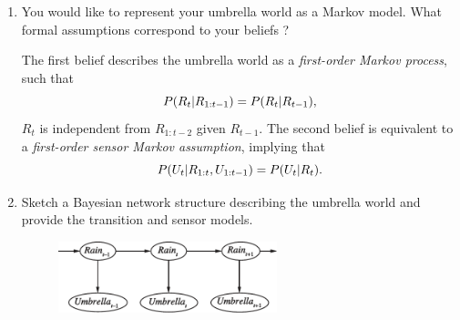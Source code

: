 \documentclass[11pt, a4paper]{article}
\begin{document}
\begin{enumerate}
    \item You would like to represent your umbrella world as a Markov model. What formal assumptions correspond to your beliefs ?

    \begin{solution}
        The first belief describes the umbrella world as a \emph{first-order Markov process}, such that
        \begin{equation*}
            P(R_t \vert R_{1:t-1}) = P(R_t \vert R_{t-1}),
        \end{equation*}
        \ie{} $R_t$ is independent from $R_{1:t - 2}$ given $R_{t-1}$. The second belief is equivalent to a \emph{first-order sensor Markov assumption}, implying that
        \begin{equation*}
            P(U_t \vert R_{1:t}, U_{1:t-1}) = P(U_t \vert R_{t}).
        \end{equation*}
    \end{solution}

    \item Sketch a Bayesian network structure describing the umbrella world and provide the transition and sensor models.

    \begin{solution}
        \begin{figure}[H]
            \centering
            \includegraphics[width=0.6\textwidth]{figures/e4_umbrella.pdf}
        \end{figure}


\end{solution}
\end{enumerate}
\end{document}
